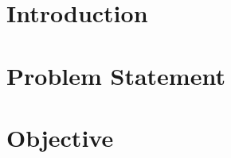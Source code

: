 \section{Introduction}\label{introduction}

\section{Problem Statement}\label{problem-statement}

\section{Objective}\label{objective}

